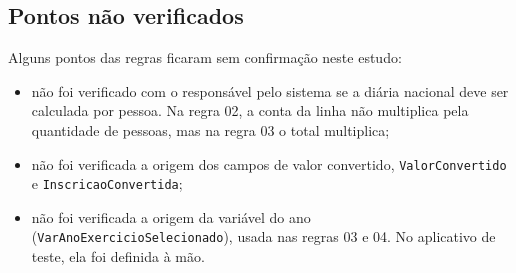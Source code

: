 \subsection{Pontos não verificados}
\label{sec:nao-verificados}

Alguns pontos das regras ficaram sem confirmação neste estudo:

\begin{itemize}\sloppy
    \item não foi verificado com o responsável pelo sistema se a diária nacional deve ser calculada por pessoa. Na regra 02, a conta da linha não multiplica pela quantidade de pessoas, mas na regra 03 o total multiplica;
    \item não foi verificada a origem dos campos de valor convertido, \texttt{Valor\allowbreak Convertido} e \texttt{Inscricao\allowbreak Convertida};
    \item não foi verificada a origem da variável do ano (\texttt{VarAno\allowbreak Exercicio\allowbreak Selecionado}), usada nas regras 03 e 04. No aplicativo de teste, ela foi definida à mão.
\end{itemize}

